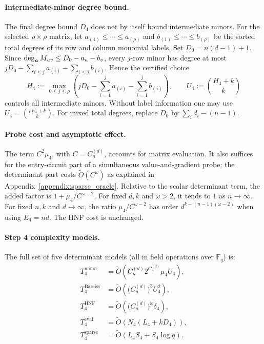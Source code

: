 \paragraph{Intermediate-minor degree bound.}
The final degree bound $D_4$ does not by itself bound intermediate minors.
For the selected $\rho\times\rho$ matrix, let $a_{(1)}\le\cdots\le a_{(\rho)}$ and $b_{(1)}\le\cdots\le b_{(\rho)}$ be the sorted total degrees of its row and column monomial labels. Set $D_0=n(d-1)+1$. Since $\deg_{{\boldsymbol{a}}}M_{uv}\le D_0-a_u-b_v$, every $j$-row minor has degree at most $jD_0-\sum_{i\le j}a_{(i)}-\sum_{i\le j}b_{(i)}$. Hence the certified choice
\begin{equation}\label{eq:step4_minor_support}
 H_4:=\max_{0\le j\le\rho}\left(jD_0-\sum_{i=1}^j a_{(i)}-\sum_{i=1}^j b_{(i)}\right),
 \qquad U_4:=\binom{H_4+k}{k}
\end{equation}
controls all intermediate minors. Without label information one may use $U_4=\binom{\rho E_4+k}{k}$. For mixed total degrees, replace $D_0$ by $\sum_i d_i-(n-1)$.

\paragraph{Probe cost and asymptotic effect.}
The term $C^2\mu_4$, with $C=C_n^{(d)}$, accounts for matrix evaluation. It also suffices for the entry-circuit part of a simultaneous value-and-gradient probe; the determinant part costs $\widetilde O(C^\omega)$ as explained in Appendix~\ref{appendix:sparse_oracle}.
Relative to the scalar determinant term, the added factor is $1+\mu_4/C^{\omega-2}$. For fixed $d,k$ and $\omega>2$, it tends to $1$ as $n\to\infty$. For fixed $n,k$ and $d\to\infty$, the ratio $\mu_4/C^{\omega-2}$ has order $d^{k-(n-1)(\omega-2)}$ when using $E_4=nd$. The HNF cost is unchanged.

\paragraph{Step 4 complexity models.}
The full set of five determinant models (all in field operations over $\mathbb{F}_q$) is:
\begin{align*}
	T_{4}^{\mathrm{minor}} &= \widetilde{O}\!\left(C_n^{(d)}2^{C_n^{(d)}}\mu_4U_4\right),\\
	T_{4}^{\mathrm{Bareiss}} &= \widetilde{O}\!\left(\bigl(C_n^{(d)}\bigr)^3U_4^2\right),\\
	T_{4}^{\mathrm{HNF}} &= \widetilde{O}\!\left(\bigl(C_n^{(d)}\bigr)^{\omega}\delta_4\right),\\
	T_{4}^{\mathrm{eval}} &= \widetilde{O}\!\left(N_4(L_4+kD_4)\right),\\
	T_{4}^{\mathrm{sparse}} &= \widetilde{O}(L_4S_4 + S_4\log q).
\end{align*}

